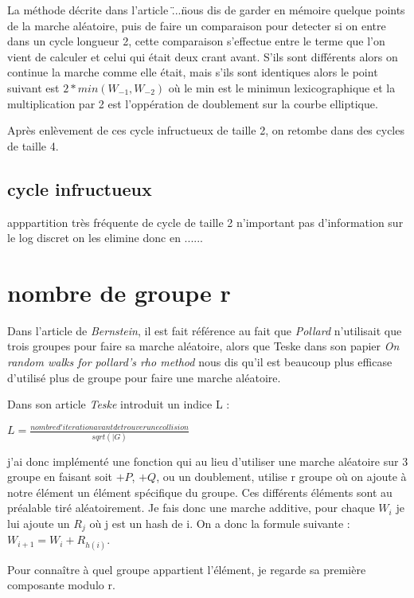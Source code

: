 \documentclass[a4paper,10pt]{report}
\begin{document}
La méthode décrite dans l'article \" ...\" nous dis de garder en mémoire quelque points de la marche aléatoire, puis de faire un comparaison pour detecter si on entre dans un cycle
longueur 2, cette comparaison s'effectue entre le terme que l'on vient de calculer et celui qui était deux crant avant.
S'ils sont différents alors on continue la marche comme elle était, mais s'ils sont identiques alors le point suivant est $2*min(W_{-1},W_{-2})$ où le min est le minimun lexicographique et
la multiplication par 2 est l'oppération de doublement sur la courbe elliptique.

Après enlèvement de ces cycle infructueux de taille 2, on retombe dans des cycles de taille 4.

\section{cycle infructueux}

apppartition très fréquente de cycle de taille 2 n'important pas d'information sur le log discret on les elimine donc en ......

\chapter{nombre de groupe r}

Dans l'article de \textit{Bernstein}, il est fait référence au fait que \textit{Pollard} n'utilisait que trois groupes pour faire sa marche aléatoire, 
alors que Teske dans son papier \textit{On random walks for pollard's rho method} nous dis qu'il est beaucoup plus efficase d'utilisé plus de groupe 
pour faire une marche aléatoire.

Dans son article \textit{Teske} introduit un indice L :
\begin{center}
 $ L = \frac{nombre d'iteration avant de trouver une collision}{sqrt(|G)} $
\end{center}

j'ai donc implémenté une fonction qui au lieu d'utiliser une marche aléatoire sur 3 groupe en faisant soit $+P$, $+Q$, ou un doublement,
utilise r groupe où on ajoute à notre élément un élément spécifique du groupe. Ces différents éléments sont au préalable tiré aléatoirement.
Je fais donc une marche additive, pour chaque $W_i$ je lui ajoute un $R_j$ où j est un hash de i. On a donc la formule suivante : 
$ W_{i+1} = W_{i} + R_{h(i)} $.

Pour connaître à quel groupe appartient l'élément, je regarde sa première composante modulo r.
\end{document}
